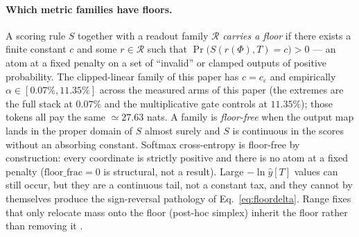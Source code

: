\documentclass[preprint,12pt]{elsarticle}
\begin{document}
\paragraph{Which metric families have floors.}
A scoring rule $S$ together with a readout family $\mathcal{R}$
\emph{carries a floor} if there exists a finite constant $c$ and some
$r\in\mathcal{R}$ such that
$\Pr\bigl(S(r(\Phi),T)=c\bigr)>0$ --- an atom at a fixed penalty on a
set of ``invalid'' or clamped outputs of positive probability. The
clipped-linear family of this paper has $c=c_\varepsilon$ and
empirically $\alpha\in[0.07\%,11.35\%]$ across the measured arms of this
paper (the extremes are the full stack at $0.07\%$ and the multiplicative
gate controls at $11.35\%$); those
tokens all pay the same $\simeq 27.63$ nats. A family is
\emph{floor-free} when the output map lands in the proper domain of
$S$ almost surely and $S$ is continuous in the scores without an
absorbing constant. Softmax cross-entropy is floor-free by
construction: every coordinate is strictly positive and there is no
atom at a fixed penalty ($\mathrm{floor\_frac}=0$ is structural, not a
result). Large $-\ln\hat y[T]$ values can still occur, but they are a
continuous tail, not a constant tax, and they cannot by themselves
produce the sign-reversal pathology of Eq.~\eqref{eq:floordelta}.
Range fixes that only relocate mass onto the floor (post-hoc simplex)
inherit the floor rather than removing it \cite{redemf}.
\end{document}
